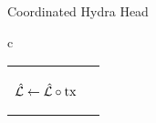 \begin{figure*}[t!]
\begin{algobox}{Coordinated Hydra Head}
\begin{tabular}{c}
\begin{tabular}{c@{}c}
{\begin{walgo}{0.65}
{              $\hat {\mathcal L} \gets \hat {\mathcal L}\circ\mathrm{tx}$ %

            
          }

          \vspace{12pt} %

          \On{$(\hpRS,s,T)$ %
            from $\party_j$}{ %

            \Req $s = \hats + 1$ %
            and $\hpLdr(s) = j$ \; %

            \Wait{$\bars = \hats$ %
              and $\barmU\applytx T \not= \bot$ %
            }{ %
               $\hats \gets \bars + 1$ \; %

               $\forall\tx\in\Reach^{\mT}(T)$:
                \Out $(\hpSeen,\tx)$ \; %
              
               $\hatmU \gets
               \Sno(\hats,\barmU\applytx T )$ \; %

               $\msSig_i \gets %
               \msSign(\hyPr, (\hats \| U_{0}.h) \| \hatmU.h)$ \; %
 
               \Send $(\hpAS,\hats,\msSig_i)$ %
               to $\party_j$ \; %

                 $\hatmT :\subseteq_{\mbox{max}} \mT$ s.t. $\hatmU\applytx\hatmT\not=\bot$ \; %
                 $\hatmL \gets \hatmU\applytx\hatmT$
            }
           }
          
        \end{walgo}
        }
        &

        \adjustbox{valign=t,scale=\sfact}{
        \begin{walgo}{0.6}
          \On{$(\hpAS,s,\msSig_j)$ %
            from $\party_j$}{ %

            \Req $s \in \{\hats,\hats+1\}$ \; %

            \Wait{$\hats=s$
            }{ %
            
            \Req $\hatmU.\hpSigs[j] = \undefined$ \; %

            $\hatmU.\hpSigs[j] \gets \msSig_j$ \; %

            \If{$\forall k: \hatmU.\hpSigs[k] \neq \undefined$}{ %
              $\msCSig %
              \gets \msComb((s \| U_{0}.h) \| \hatmU.\hash, %
              \msVKL, \hatmU.\hpSigs)$ \; %
              
}}}
\end{walgo}}
\end{tabular}
\end{tabular}
\end{algobox}
\end{figure*}
